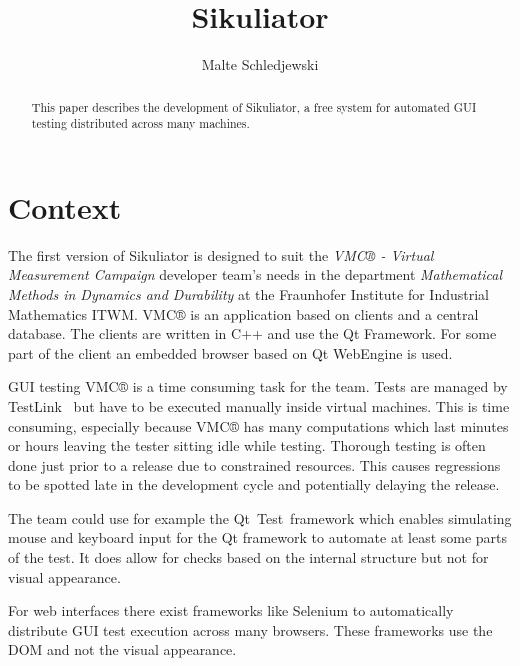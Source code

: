 \documentclass[a4paper,twocolumn]{article}
\title{Sikuliator}
\author{Malte Schledjewski}
\newcommand{\VMC}[0]{VMC®}
\newcommand{\Sik}[0]{Sikuliator}
\begin{document}


\maketitle
\begin{abstract}
	
	
	This paper describes the development of \Sik{}, 
	a free system for automated GUI testing distributed across many machines.
	
\end{abstract}
\listoftodos

\tableofcontents

\section{Context}

The first version of \Sik{} is designed to suit the 
\emph{\VMC{} - Virtual Measurement Campaign}\cite{VMConline} developer team's needs in the
department \emph{Mathematical Methods in Dynamics and Durability} 
at the Fraunhofer Institute for Industrial Mathematics ITWM.
\VMC{} is an application based on clients and a central database.
The clients are written in C++ and use the Qt Framework.
For some part of the client an embedded browser based on Qt WebEngine is used.

GUI testing \VMC{} is a time consuming task for the team.
Tests are managed by TestLink~\cite{TestLink} but have to be executed manually inside virtual machines.
This is time consuming, especially because \VMC{} has many computations which last minutes or hours 
leaving the tester sitting idle while testing. 
Thorough testing is often done just prior to a release due to constrained resources.
This causes regressions to be spotted late in the development cycle and potentially delaying the release. 

The team could use for example the Qt~Test~framework\cite{QtTest} which enables simulating mouse and keyboard input for the Qt framework to automate at least some parts of the test.
It does allow for checks based on the internal structure but not for visual appearance.

For web interfaces there exist frameworks like Selenium\cite{Selenium} to automatically distribute GUI test execution across many browsers.
These frameworks use the DOM and not the visual appearance.
\end{document}
